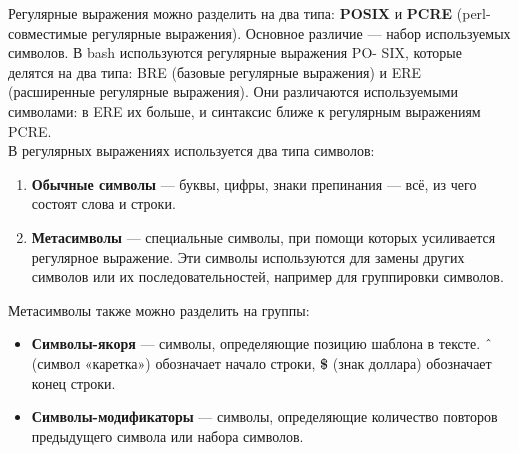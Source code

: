 \documentclass[14pt, a4paper]{article}
\begin{document}
Регулярные выражения можно разделить на два типа: \textbf{POSIX} и \textbf{PCRE} (perl-совместимые регулярные
выражения). Основное различие — набор используемых символов. В bash используются регулярные
выражения PO- SIX, которые делятся на два типа: BRE (базовые регулярные выражения) и ERE
(расширенные регулярные выражения). Они различаются используемыми символами: в ERE их
больше, и синтаксис ближе к регулярным выражениям PCRE.\\

\noindent В регулярных выражениях используется два типа символов:
\begin{enumerate}
    \item \textbf{Обычные символы} — буквы, цифры, знаки препинания — всё, из чего состоят слова и
    строки.
    \item \textbf{Метасимволы} — специальные символы, при помощи которых усиливается регулярное
    выражение. Эти символы используются для замены других символов или их
    последовательностей, например для группировки символов.
\end{enumerate}

\vspace{0.2cm}

\noindent Метасимволы также можно разделить на группы:
\begin{itemize}
    \item \textbf{Символы-якоря} — символы, определяющие позицию шаблона в тексте. \textbf{$\string^$} (символ «каретка»)
    обозначает начало строки, \textbf{\$} (знак доллара) обозначает конец строки.
    \item \textbf{Символы-модификаторы} — символы, определяющие количество повторов предыдущего
    символа или набора символов.\\
\end{itemize}
\end{document}
